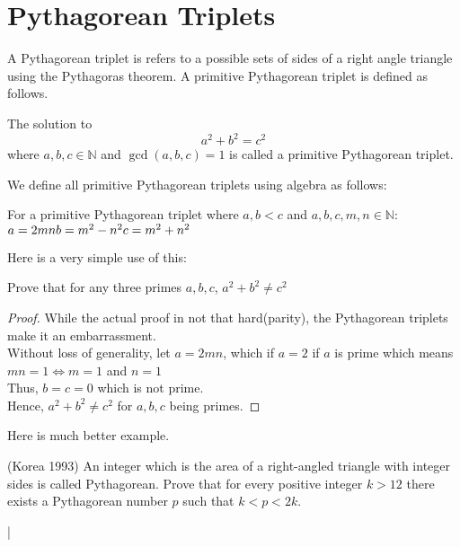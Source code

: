 \section{Pythagorean Triplets}
A Pythagorean triplet is refers to a possible sets of sides of a right angle triangle using the Pythagoras theorem. A primitive Pythagorean triplet is defined as follows.\\
\begin{definition}
    The solution to \[a^2+b^2=c^2\] where $a,b,c \in \mathbb{N}$ and $\gcd(a,b,c) = 1$ is called a primitive Pythagorean triplet.
\end{definition}
We define all primitive Pythagorean triplets using algebra as follows:\\
\begin{theorem}
    For a primitive Pythagorean triplet where $a,b<c$ and $a,b,c, m,n \in \mathbb{N}$:\\
    $a=2mn\\
    b = m^2-n^2\\
    c=m^2+n^2$
\end{theorem}
Here is a very simple use of this:\\
\begin{example}
    Prove that for any three primes $a,b,c$, $a^2+b^2 \neq c^2$
\end{example}
\begin{proof}
    While the actual proof in not that hard(parity), the Pythagorean triplets make it an embarrassment.\\
    Without loss of generality, let $a=2mn$, which if $a=2$ if $a$ is prime which means $mn=1 \iff m=1$ and $n=1$\\
    Thus, $b=c=0$ which is not prime.\\
    Hence, $a^2+b^2 \neq c^2$ for $a,b,c$ being primes.
\end{proof}
Here is much better example.\\
\begin{example}
(Korea 1993)
    An integer which is the area of a right-angled triangle with integer sides is called Pythagorean. Prove that for every positive integer $k > 12$ there exists a Pythagorean number $p$ such that $k <  p < 2k$.
\end{example}|
